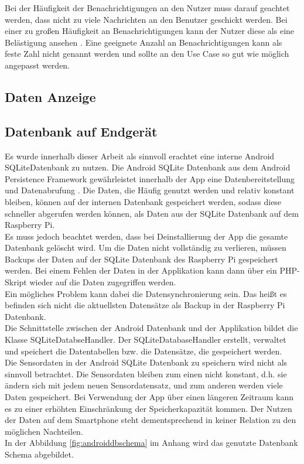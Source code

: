Bei der Häufigkeit der Benachrichtigungen an den Nutzer muss darauf geachtet werden, dass nicht zu viele Nachrichten an den Benutzer geschickt werden. Bei einer zu großen Häufigkeit an Benachrichtigungen kann der Nutzer diese als eine Belästigung ansehen \cite{gadgets:amountnotifications}. Eine geeignete Anzahl an Benachrichtigungen kann als feste Zahl nicht genannt werden und sollte an den Use Case so gut wie möglich angepasst werden.

\subsection{Daten Anzeige}

\subsection{Datenbank auf Endgerät}
Es wurde innerhalb dieser Arbeit als sinnvoll erachtet eine interne Android SQLiteDatenbank zu nutzen.
Die Android SQLite Datenbank aus dem Android Persistence Framework gewährleistet innerhalb der App eine Datenbereitstellung und Datenabrufung \cite{ieee:androidpersistence}. Die Daten, die Häufig genutzt werden und relativ konstant bleiben, können auf der internen Datenbank gespeichert werden, sodass diese schneller abgerufen werden können, als Daten aus der SQLite Datenbank auf dem Raspberry Pi.\\
Es muss jedoch beachtet werden, dass bei Deinstallierung der App die gesamte Datenbank gelöscht wird. Um die Daten nicht vollständig zu verlieren, müssen Backups der Daten auf der SQLite Datenbank des Raspberry Pi gespeichert werden. Bei einem Fehlen der Daten in der Applikation kann dann über ein PHP-Skript wieder auf die Daten zugegriffen werden.\\ Ein mögliches Problem kann dabei die Datensynchronierung sein. Das heißt es befinden sich nicht die aktuellsten Datensätze als Backup in der Raspberry Pi Datenbank.\\
Die Schnittstelle zwischen der Android Datenbank und der Applikation bildet die Klasse SQLiteDatabseHandler. Der SQLiteDatabaseHandler erstellt, verwaltet und speichert die Datentabellen bzw. die Datensätze, die gespeichert werden.\\
Die Sensordaten in der Android SQLite Datenbank zu speichern wird nicht als sinnvoll betrachtet. Die Sensordaten bleiben zum einen nicht konstant, d.h. sie ändern sich mit jedem neuen Sensordatensatz, und zum anderen werden viele Daten gespeichert. Bei Verwendung der App über einen längeren Zeitraum kann es zu einer erhöhten Einschränkung der Speicherkapazität kommen. Der Nutzen der Daten auf dem Smartphone steht dementsprechend in keiner Relation zu den möglichen Nachteilen.\\
In der Abbildung \ref{fig:androiddbschema} im Anhang wird das genutzte Datenbank Schema abgebildet.\\

